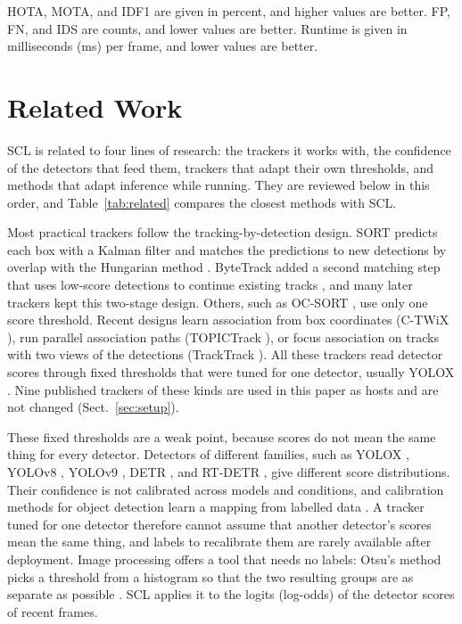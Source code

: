 \documentclass[pdflatex,sn-mathphys-num]{sn-jnl}
\newcommand{\scl}{SCL}
\begin{document}
HOTA, MOTA, and IDF1 are given in percent, and higher values are better. FP,
FN, and IDS are counts, and lower values are better. Runtime is given in
milliseconds (ms) per frame, and lower values are better.
\section{Related Work}\label{sec:related}

\scl{} is related to four lines of research: the trackers it works with, the
confidence of the detectors that feed them, trackers that adapt their own
thresholds, and methods that adapt inference while running. They are
reviewed below in this order, and Table~\ref{tab:related} compares the
closest methods with \scl{}.

Most practical trackers follow the tracking-by-detection design. SORT
predicts each box with a Kalman filter and matches the predictions to new
detections by overlap with the Hungarian method \cite{bewley2016sort}.
ByteTrack added a second matching step that uses low-score detections to
continue existing tracks \cite{zhang2022bytetrack}, and many later trackers
kept this two-stage design. Others, such as OC-SORT \cite{cao2023ocsort}, use
only one score threshold. Recent designs learn association from box
coordinates (C-TWiX \cite{miah2025twix}), run parallel association paths
(TOPICTrack \cite{cao2025topictrack}), or focus association on tracks with
two views of the detections (TrackTrack \cite{shim2025tracktrack}). All these
trackers read detector scores through fixed thresholds that were tuned for one
detector, usually YOLOX \cite{ge2021yolox}. Nine published trackers of these
kinds are used in this paper as hosts and are not changed
(Sect.~\ref{sec:setup}).

These fixed thresholds are a weak point, because scores do not mean the same
thing for every detector. Detectors of different families, such as YOLOX
\cite{ge2021yolox}, YOLOv8 \cite{jocher2023yolov8}, YOLOv9
\cite{wang2024yolov9}, DETR \cite{carion2020detr}, and RT-DETR
\cite{zhao2024rtdetr}, give different score distributions. Their confidence
is not calibrated across models and conditions, and calibration methods for
object detection learn a mapping from labelled data
\cite{kuppers2020detcalib}. A tracker tuned for one detector therefore cannot
assume that another detector's scores mean the same thing, and labels to
recalibrate them are rarely available after deployment. Image processing
offers a tool that needs no labels: Otsu's method picks a threshold from a
histogram so that the two resulting groups are as separate as possible
\cite{otsu1979}. \scl{} applies it to the logits (log-odds) of the detector
scores of recent frames.
\end{document}
